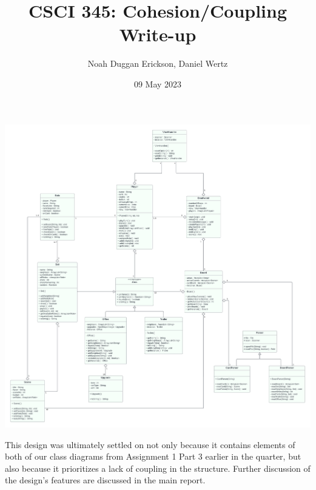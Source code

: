 \documentclass[letterpaper, landscape, twoside, fullpage]{report}
\title{CSCI 345: Cohesion/Coupling Write-up}
\author{Noah Duggan Erickson, Daniel Wertz}
\date{09 May 2023}
\begin{document}
\maketitle
\begin{center}
\includegraphics[scale=0.25]{Diagram.pdf}
\end{center}

\newpage

This design was ultimately settled on not only because it contains elements of both of our class diagrams from Assignment 1 Part 3 earlier in the quarter, but also because it prioritizes a lack of coupling in the structure. Further discussion of the design's features are discussed in the main report.
\end{document}
